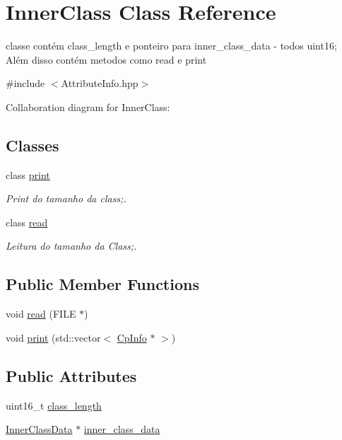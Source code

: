 \hypertarget{class_inner_class}{}\section{Inner\+Class Class Reference}
\label{class_inner_class}


classe contém class\+\_\+length e ponteiro para inner\+\_\+class\+\_\+data -\/ todos uint16; Além disso contém metodos como read e print  




{\ttfamily \#include $<$Attribute\+Info.\+hpp$>$}



Collaboration diagram for Inner\+Class\+:
\subsection*{Classes}
\begin{DoxyCompactItemize}
\item 
class \hyperlink{class_inner_class_1_1print}{print}
\begin{DoxyCompactList}\small\item\em Print do tamanho da class;. \end{DoxyCompactList}\item 
class \hyperlink{class_inner_class_1_1read}{read}
\begin{DoxyCompactList}\small\item\em Leitura do tamanho da Class;. \end{DoxyCompactList}\end{DoxyCompactItemize}
\subsection*{Public Member Functions}
\begin{DoxyCompactItemize}
\item 
void \hyperlink{class_inner_class_ab178cb43a3277c1ade99a8a0c346cd49}{read} (F\+I\+LE $\ast$)
\item 
void \hyperlink{class_inner_class_acf89443e049952e22a4afeaa43e3bc8c}{print} (std\+::vector$<$ \hyperlink{class_cp_info}{Cp\+Info} $\ast$ $>$)
\end{DoxyCompactItemize}
\subsection*{Public Attributes}
\begin{DoxyCompactItemize}
\item 
uint16\+\_\+t \hyperlink{class_inner_class_a7976c7530d97d879907ce035a9b7d2c7}{class\+\_\+length}
\item 
\hyperlink{class_inner_class_data}{Inner\+Class\+Data} $\ast$ \hyperlink{class_inner_class_ad9876452a134d1d5063223610dae7d6a}{inner\+\_\+class\+\_\+data}
\end{DoxyCompactItemize}


